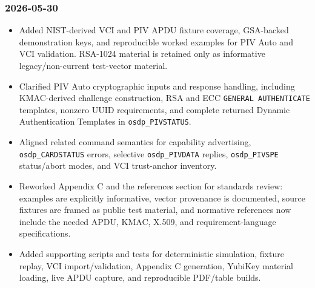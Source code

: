 \subsubsection*{2026-05-30}
\begin{itemize}
  \item Added NIST-derived VCI and PIV APDU fixture coverage, GSA-backed demonstration keys, and
    reproducible worked examples for PIV Auto and VCI validation. RSA-1024 material is retained only
    as informative legacy/non-current test-vector material.
  \item Clarified PIV Auto cryptographic inputs and response handling, including KMAC-derived
    challenge construction, RSA and ECC \texttt{GENERAL AUTHENTICATE} templates, nonzero UUID
    requirements, and complete returned  Dynamic Authentication Templates in
    \texttt{osdp\_PIVSTATUS}.
  \item Aligned related command semantics for capability advertising, \texttt{osdp\_CARDSTATUS}
    errors, selective \texttt{osdp\_PIVDATA} replies, \texttt{osdp\_PIVSPE} status/abort modes, and
    VCI trust-anchor inventory.
  \item Reworked Appendix C and the references section for standards review: examples are explicitly
    informative, vector provenance is documented, source fixtures are framed as public test
    material, and normative references now include the needed APDU, KMAC, X.509, and
    requirement-language specifications.
  \item Added supporting scripts and tests for deterministic simulation, fixture replay, VCI
    import/validation, Appendix C generation, YubiKey material loading, live APDU capture, and
    reproducible PDF/table builds.
\end{itemize}

